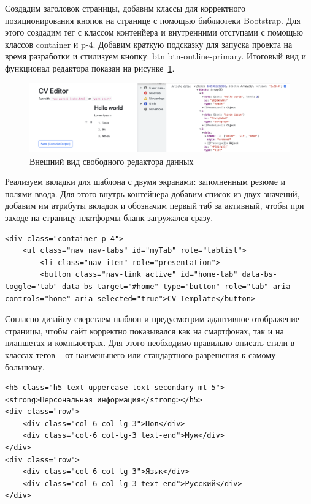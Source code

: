 \documentclass[master, och, diploma]{SCWorks}
\begin{document}
Создадим заголовок страницы, добавим классы для корректного позиционирования кнопок на странице с помощью библиотеки Bootstrap. Для этого создадим тег с классом контенйера и внутренними отступами с помощью классов container и p-4. Добавим краткую подсказку для запуска проекта на время разработки и стилизуем кнопку: btn btn-outline-primary. Итоговый вид и функционал редактора показан на рисунке~\ref{fig:21}.
\begin{figure}[!ht]
    \centering
    \includegraphics[width=12cm]{images/image22.png}
    \caption{\label{fig:21}%
        Внешний вид свободного редактора данных}
\end{figure}

Реализуем вкладки для шаблона с двумя экранами: заполненным резюме и полями ввода. Для этого внутрь контейнера добавим список из двух значений, добавим им атрибуты вкладок и обозначим первый таб за активный, чтобы при заходе на страницу платформы бланк загружался сразу.
\begin{verbatim}
<div class="container p-4">
    <ul class="nav nav-tabs" id="myTab" role="tablist">
        <li class="nav-item" role="presentation">
        <button class="nav-link active" id="home-tab" data-bs-toggle="tab" data-bs-target="#home" type="button" role="tab" aria-controls="home" aria-selected="true">CV Template</button>
\end{verbatim}

Согласно дизайну сверстаем шаблон и предусмотрим адаптивное отображение страницы, чтобы сайт корректно показывался как на смартфонах, так и на планшетах и компьюетрах. Для этого необходимо правильно описать стили в классах тегов – от наименьшего или стандартного разрешения к самому большому. 
\begin{verbatim}
<h5 class="h5 text-uppercase text-secondary mt-5">
<strong>Персональная информация</strong></h5>
<div class="row">
    <div class="col-6 col-lg-3">Пол</div>
    <div class="col-6 col-lg-3 text-end">Муж</div>
</div>
<div class="row">
    <div class="col-6 col-lg-3">Язык</div>
    <div class="col-6 col-lg-3 text-end">Русский</div>
</div>
\end{verbatim}
\end{document}
